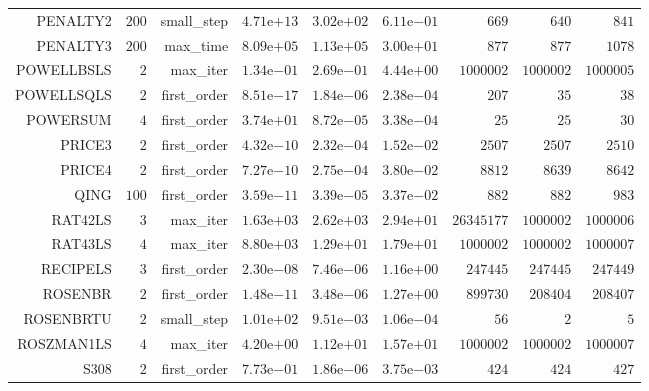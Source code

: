 \begin{longtable}{rrrrrrrrr}
PENALTY2 & \(   200\) & small\_step & \( 4.71\)e\(+13\) & \( 3.02\)e\(+02\) & \( 6.11\)e\(-01\) & \(   669\) & \(   640\) & \(   841\) \\
PENALTY3 & \(   200\) & max\_time & \( 8.09\)e\(+05\) & \( 1.13\)e\(+05\) & \( 3.00\)e\(+01\) & \(   877\) & \(   877\) & \(  1078\) \\
POWELLBSLS & \(     2\) & max\_iter & \( 1.34\)e\(-01\) & \( 2.69\)e\(-01\) & \( 4.44\)e\(+00\) & \(1000002\) & \(1000002\) & \(1000005\) \\
POWELLSQLS & \(     2\) & first\_order & \( 8.51\)e\(-17\) & \( 1.84\)e\(-06\) & \( 2.38\)e\(-04\) & \(   207\) & \(    35\) & \(    38\) \\
POWERSUM & \(     4\) & first\_order & \( 3.74\)e\(+01\) & \( 8.72\)e\(-05\) & \( 3.38\)e\(-04\) & \(    25\) & \(    25\) & \(    30\) \\
PRICE3 & \(     2\) & first\_order & \( 4.32\)e\(-10\) & \( 2.32\)e\(-04\) & \( 1.52\)e\(-02\) & \(  2507\) & \(  2507\) & \(  2510\) \\
PRICE4 & \(     2\) & first\_order & \( 7.27\)e\(-10\) & \( 2.75\)e\(-04\) & \( 3.80\)e\(-02\) & \(  8812\) & \(  8639\) & \(  8642\) \\
QING & \(   100\) & first\_order & \( 3.59\)e\(-11\) & \( 3.39\)e\(-05\) & \( 3.37\)e\(-02\) & \(   882\) & \(   882\) & \(   983\) \\
RAT42LS & \(     3\) & max\_iter & \( 1.63\)e\(+03\) & \( 2.62\)e\(+03\) & \( 2.94\)e\(+01\) & \(26345177\) & \(1000002\) & \(1000006\) \\
RAT43LS & \(     4\) & max\_iter & \( 8.80\)e\(+03\) & \( 1.29\)e\(+01\) & \( 1.79\)e\(+01\) & \(1000002\) & \(1000002\) & \(1000007\) \\
RECIPELS & \(     3\) & first\_order & \( 2.30\)e\(-08\) & \( 7.46\)e\(-06\) & \( 1.16\)e\(+00\) & \(247445\) & \(247445\) & \(247449\) \\
ROSENBR & \(     2\) & first\_order & \( 1.48\)e\(-11\) & \( 3.48\)e\(-06\) & \( 1.27\)e\(+00\) & \(899730\) & \(208404\) & \(208407\) \\
ROSENBRTU & \(     2\) & small\_step & \( 1.01\)e\(+02\) & \( 9.51\)e\(-03\) & \( 1.06\)e\(-04\) & \(    56\) & \(     2\) & \(     5\) \\
ROSZMAN1LS & \(     4\) & max\_iter & \( 4.20\)e\(+00\) & \( 1.12\)e\(+01\) & \( 1.57\)e\(+01\) & \(1000002\) & \(1000002\) & \(1000007\) \\
S308 & \(     2\) & first\_order & \( 7.73\)e\(-01\) & \( 1.86\)e\(-06\) & \( 3.75\)e\(-03\) & \(   424\) & \(   424\) & \(   427\) \\

\end{longtable}
